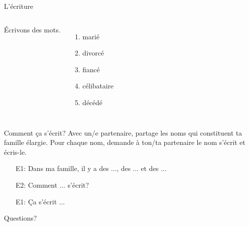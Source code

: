 \documentclass{beamer}
\begin{document}
  \begin{frame}{L'écriture }
    \begin{columns}
        Écrivons des mots. \\
        \begin{enumerate}
          \item marié
          \item divorcé
          \item fiancé
          \item célibataire
          \item décédé
        \end{enumerate}
        \begin{minipage}[c][0.6\textheight]{\linewidth}
          \begin{center}
          \end{center}
        \end{minipage}
    \end{columns}
  \end{frame}

  \begin{frame}{Comment ça s'écrit? }
    Avec un/e partenaire, partage les noms qui constituent ta famille élargie.
    Pour chaque nom, demande à ton/ta partenaire le nom s'écrit et écris-le. \\
    \begin{itemize}
      \item[E1:] Dans ma famille, il y a des ..., des ... et des ...
      \item[E2:] Comment ... s'écrit?
      \item[E1:] Ça s'écrit ...
    \end{itemize}
  \end{frame}

  \begin{frame}{}
    \begin{center}
      \Large Questions?
    \end{center}
  \end{frame}
\end{document}
